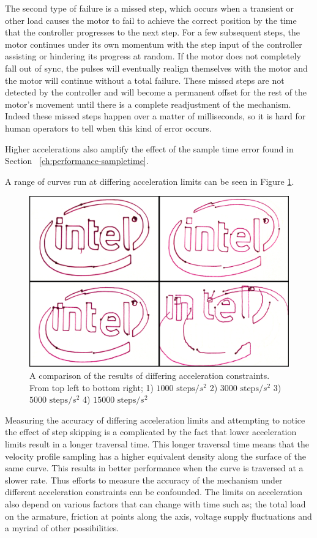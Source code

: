 The second type of failure is a missed step, which occurs when a transient or other load causes the motor to fail to achieve the correct position by the time that the controller progresses to the next step. For a few subsequent steps, the motor continues under its own momentum with the step input of the controller assisting or hindering its progress at random. If the motor does not completely fall out of sync, the pulses will eventually realign themselves with the motor and the motor will continue without a total failure. These missed steps are not detected by the controller and will become a permanent offset for the rest of the motor's movement until there is a complete readjustment of the mechanism. Indeed these missed steps happen over a matter of milliseconds, so it is hard for human operators to tell when this kind of error occurs.

Higher accelerations also amplify the effect of the sample time error found in Section ~\ref{ch:performance-sampletime}.

A range of curves run at differing acceleration limits can be seen in Figure \ref{fig:accelLimits}.
	
\begin{figure}[htbp]  
\includegraphics[width=\textwidth]{figures/performance/accelLimits.png}
\caption[Comparison of differing acceleration constraints]{A comparison of the results of differing acceleration constraints. From top left to bottom right; 1) $1000\text{ steps}/s^2$ 2) $3000\text{ steps}/s^2$ 3) $5000\text{ steps}/s^2$ 4) $15000\text{ steps}/s^2$
\label{fig:accelLimits}}
\end{figure}  	

Measuring the accuracy of differing acceleration limits and attempting to notice the effect of step skipping is a complicated by the fact that lower acceleration limits result in a longer traversal time. This longer traversal time means that the velocity profile sampling has a higher equivalent density along the surface of the same curve. This results in better performance when the curve is traversed at a slower rate. Thus efforts to measure the accuracy of the mechanism under different acceleration constraints can be confounded. The limits on acceleration also depend on various factors that can change with time such as; the total load on the armature, friction at points along the axis, voltage supply fluctuations and a myriad of other possibilities.


